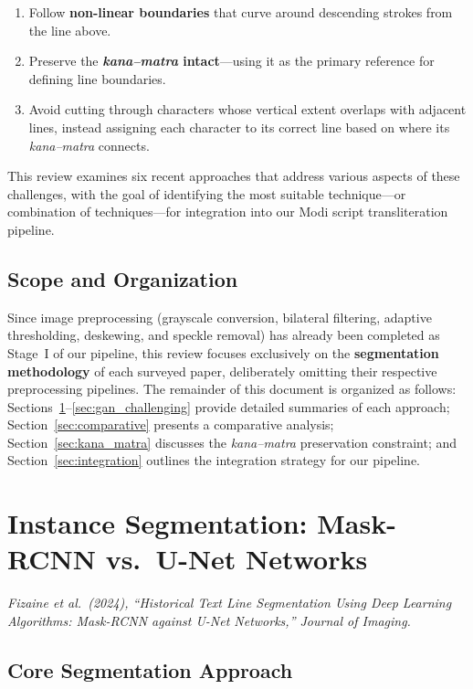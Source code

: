 \documentclass[11pt, a4paper]{article}
\begin{document}
\begin{enumerate}[leftmargin=1.5em]
    \item Follow \textbf{non-linear boundaries} that curve around descending strokes from the line above.
    \item Preserve the \textbf{\textit{kana--matra} intact}---using it as the primary reference for defining line boundaries.
    \item Avoid cutting through characters whose vertical extent overlaps with adjacent lines, instead assigning each character to its correct line based on where its \textit{kana--matra} connects.
\end{enumerate}

This review examines six recent approaches that address various aspects of these challenges, with the goal of identifying the most suitable technique---or combination of techniques---for integration into our Modi script transliteration pipeline.

\subsection{Scope and Organization}

Since image preprocessing (grayscale conversion, bilateral filtering, adaptive thresholding, deskewing, and speckle removal) has already been completed as Stage~I of our pipeline, this review focuses exclusively on the \textbf{segmentation methodology} of each surveyed paper, deliberately omitting their respective preprocessing pipelines. The remainder of this document is organized as follows: Sections~\ref{sec:mask_rcnn}--\ref{sec:gan_challenging} provide detailed summaries of each approach; Section~\ref{sec:comparative} presents a comparative analysis; Section~\ref{sec:kana_matra} discusses the \textit{kana--matra} preservation constraint; and Section~\ref{sec:integration} outlines the integration strategy for our pipeline.


\section{Instance Segmentation: Mask-RCNN vs.\ U-Net Networks}
\label{sec:mask_rcnn}

\noindent\textit{Fizaine et al.\ (2024), ``Historical Text Line Segmentation Using Deep Learning Algorithms: Mask-RCNN against U-Net Networks,'' Journal of Imaging.}

\subsection{Core Segmentation Approach}
\end{document}
